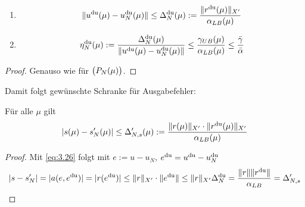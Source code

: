 \begin{satz} \beginwithlist \label{3.61}
	\begin{enumerate}
		\item
			\[
				\|u^{\mathrm{du}}(\mu)-u_N^{\mathrm{du}}(\mu)\| \leq \Delta_N^{\mathrm{du}}(\mu) := \frac{\|r^{\mathrm{du}}(\mu)\|_{X'}}{\alpha_{LB}(\mu)}
			\]
		\item
			\[
				\eta_N^{\mathrm{du}}(\mu) := \frac{\Delta_N^{\mathrm{du}}(\mu)}{\|u^{\mathrm{du}}(\mu)-u_N^{\mathrm{du}}(\mu)\|} \leq \frac{\gamma_{UB}(\mu)}{\alpha_{LB}(\mu)} \leq \frac{\bar\gamma}{\bar\alpha}
			\]
	\end{enumerate}

	\begin{proof}
		Genauso wie für $\big(P_N(\mu)\big)$.
	\end{proof}
\end{satz}

Damit folgt gewünschte Schranke für Ausgabefehler:

\begin{satz} \label{3.62}
	Für alle $\mu$ gilt
	\[
		|s(\mu)-s_N'(\mu)| \leq \Delta_{N,s}'(\mu) := \frac{\|r(\mu)\|_{X'} \cdot \|r^{\mathrm{du}}(\mu)\|_{X'}}{\alpha_{LB}(\mu)}
	\]

	\begin{proof}
		Mit \eqref{eq:3.26} folgt mit $e := u-u_N$, $e^{\mathrm{du}} = u^{\mathrm{du}}-u_N^{\mathrm{du}}$
		\[
			|s-s_N'| = |a(e,e^{\mathrm{du}})| = |r(e^{\mathrm{du}})| \leq \|r\|_{X'} \cdot \|e^{\mathrm{du}}\| \leq \|r\|_{X'} \Delta_N^{\mathrm{du}} = \frac{\|r\| \|r^{\mathrm{du}}\|}{\alpha_{LB}} = \Delta_{N,s}'
		\]
	\end{proof}
\end{satz}

